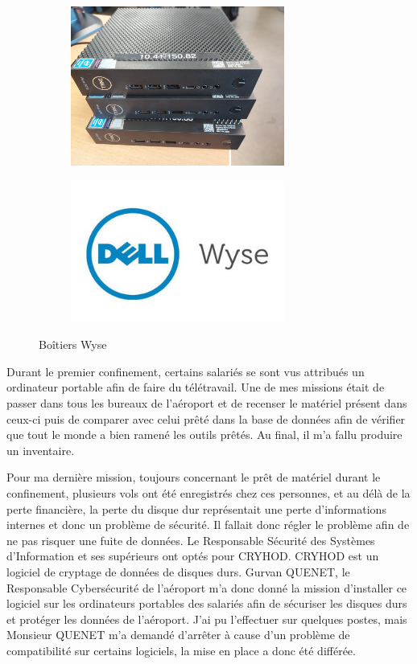 \begin{figure}[hbt!]
  \begin{subfigure}{0.5\textwidth}
    \centering
    \includegraphics[width=7cm]{Images/wyse.jpg}  
    \label{fig:wyse}
  \end{subfigure}
  \begin{subfigure}{0.5\textwidth}
    \centering
    \includegraphics[width=7cm]{Images/wyse_logo.jpg}  
    \label{fig:logowyse}
  \end{subfigure}
  \caption{Boîtiers Wyse}
\end{figure}

Durant le premier confinement, certains salariés se sont vus attribués un ordinateur portable afin de faire du télétravail. Une de mes missions était de passer dans tous les bureaux de l’aéroport et de recenser le matériel présent dans ceux-ci puis de comparer avec celui prêté dans la base de données afin de vérifier que tout le monde
a bien ramené les outils prêtés. Au final, il m'a fallu produire un inventaire.\newline


Pour ma dernière mission, toujours concernant le prêt de matériel durant le confinement, plusieurs vols ont été enregistrés chez ces personnes, et au délà de la perte financière, la perte du disque dur représentait une perte d’informations internes et donc un problème de sécurité. Il fallait donc régler le problème afin de ne pas risquer une fuite de données. Le Responsable Sécurité des Systèmes d’Information et ses supérieurs ont optés pour CRYHOD. CRYHOD est un logiciel de cryptage de données de disques durs. Gurvan QUENET, le Responsable Cybersécurité de l’aéroport m’a donc donné la mission d’installer ce logiciel sur les ordinateurs portables des salariés afin de sécuriser les disques durs et protéger les données de l’aéroport. J’ai pu l’effectuer sur quelques postes, mais Monsieur QUENET m’a demandé d’arrêter à cause d’un problème de compatibilité sur certains logiciels, la mise en place a donc été différée.

